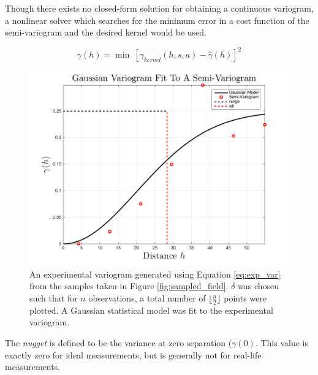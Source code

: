 \documentclass[11pt]{ucthesis}
\begin{document}
Though there exists no closed-form solution for obtaining a continuous variogram, a nonlinear solver which searches for the minimum error in a cost function of the semi-variogram and the desired kernel would be used.

\begin{equation}
\gamma(h) = \min\ [\gamma_{kernel}(h,s,a) - \hat{\gamma}(h)]^2
\end{equation}


\begin{figure}[ht!]
    \centering    
	\includegraphics[width=\linewidth]{figures/fit_kernel.png}
	\caption{An experimental variogram generated using Equation \ref{eq:exp_var} from the samples taken in Figure \ref{fig:sampled_field}. $\delta$ was chosen such that for $n$ observations, a total number of $\Big\lfloor \frac{n}{2} \Big\rfloor$ points were plotted. A Gaussian statistical model was fit to the experimental variogram.}
	\label{fig:fit_kernel}
\end{figure}

The \textit{nugget} is defined to be the variance at zero separation ($\gamma(0)$. This value is exactly zero for ideal measurements, but is generally not for real-life measurements.
\end{document}
